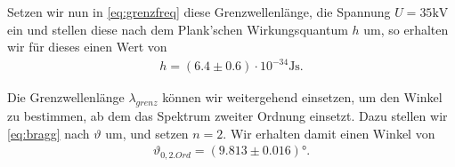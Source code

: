 Setzen wir nun in \eqref{eq:grenzfreq} diese Grenzwellenlänge, die Spannung $U = 35\si{\kilo\volt}$ ein und stellen diese nach dem Plank'schen Wirkungsquantum $h$ um, so erhalten wir für dieses einen Wert von
\begin{align}
  h = (6.4 \pm 0.6) \cdot 10^{-34} \si{\joule\second}.
\end{align}

Die Grenzwellenlänge $\lambda_{grenz}$ können wir weitergehend einsetzen, um den Winkel zu bestimmen, ab dem das Spektrum zweiter Ordnung einsetzt. Dazu stellen wir \eqref{eq:bragg} nach $\vartheta$ um, und setzen $n = 2$. Wir erhalten damit einen Winkel von
\begin{align}
  \vartheta_{0,2. Ord} = (9.813 \pm 0.016)\si{\degree}.
\end{align}
